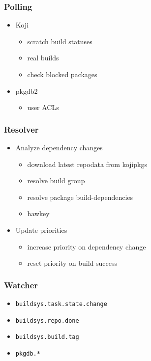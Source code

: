\documentclass[pdftex,unicode,xcolor=table]{beamer}
\begin{document}
\begin{frame}
  \frametitle{Polling}
  \begin{itemize}
    \item Koji
    \begin{itemize}
      \item scratch build statuses
      \item real builds
      \item check blocked packages
    \end{itemize}
    \item pkgdb2
    \begin{itemize}
      \item user ACLs
    \end{itemize}
  \end{itemize}
\end{frame}

\begin{frame}
  \frametitle{Resolver}
  \begin{itemize}
    \item Analyze dependency changes
    \begin{itemize}
      \item download latest repodata from kojipkgs
      \item resolve build group
      \item resolve package build-dependencies
      \item hawkey
    \end{itemize}
    \item Update priorities
    \begin{itemize}
      \item increase priority on dependency change
      \item reset priority on build success
    \end{itemize}
  \end{itemize}
\end{frame}

\begin{frame}
  \frametitle{Watcher}
  \begin{itemize}
    \item \tt{buildsys.task.state.change}
    \item \tt{buildsys.repo.done}
    \item \tt{buildsys.build.tag}
    \item \tt{pkgdb.*}
  \end{itemize}
\end{frame}
\end{document}
